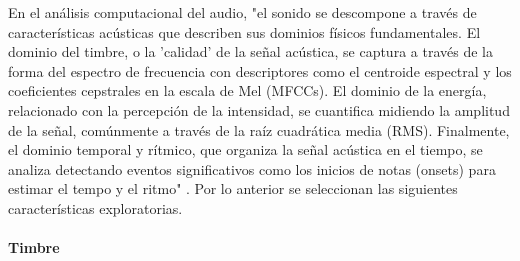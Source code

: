 \documentclass[12pt, letterpaper]{report}
\begin{document}
En el análisis computacional del audio, "el sonido se descompone a través de características acústicas que describen sus dominios físicos fundamentales. El dominio del timbre, o la 'calidad' de la señal acústica, se captura a través de la forma del espectro de frecuencia con descriptores como el centroide espectral y los coeficientes cepstrales en la escala de Mel (MFCCs). El dominio de la energía, relacionado con la percepción de la intensidad, se cuantifica midiendo la amplitud de la señal, comúnmente a través de la raíz cuadrática media (RMS). Finalmente, el dominio temporal y rítmico, que organiza la señal acústica en el tiempo, se analiza detectando eventos significativos como los inicios de notas (onsets) para estimar el tempo y el ritmo" . Por lo anterior se seleccionan las siguientes características exploratorias. 

\paragraph{Timbre}
\end{document}
